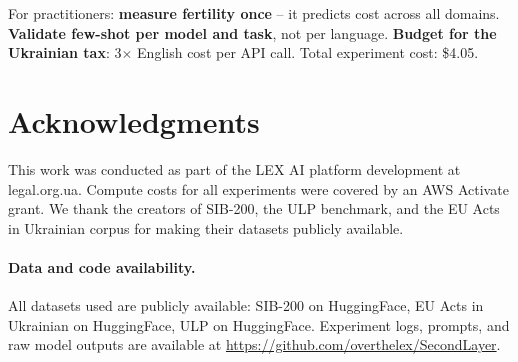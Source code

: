 \documentclass[11pt,a4paper]{article}
\begin{document}
For practitioners: \textbf{measure fertility once} -- it predicts cost across all domains. \textbf{Validate few-shot per model and task}, not per language. \textbf{Budget for the Ukrainian tax}: 3$\times$ English cost per API call. Total experiment cost: \$4.05.

\section*{Acknowledgments}

This work was conducted as part of the LEX AI platform development at legal.org.ua. Compute costs for all experiments were covered by an AWS Activate grant. We thank the creators of SIB-200, the ULP benchmark, and the EU Acts in Ukrainian corpus for making their datasets publicly available.

\paragraph{Data and code availability.} All datasets used are publicly available: SIB-200 \citep{adelani2024sib200} on HuggingFace, EU Acts in Ukrainian \citep{francophonicEU} on HuggingFace, ULP \citep{galeshchuk2024ulp} on HuggingFace. Experiment logs, prompts, and raw model outputs are available at \url{https://github.com/overthelex/SecondLayer}.
\end{document}

